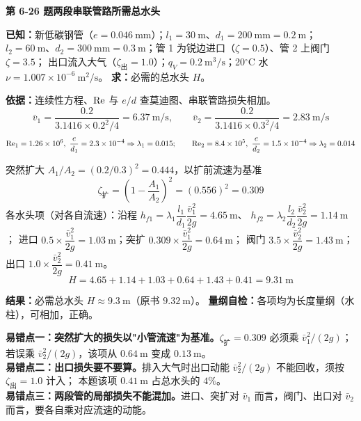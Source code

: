 \noindent\textbf{第 6-26 题\quad 两段串联管路所需总水头}

\begin{jie}
\textbf{已知：}新低碳钢管（$e=0.046\ \mathrm{mm}$）；$l_1=30\ \mathrm{m}$、$d_1=200\ \mathrm{mm}=0.2\ \mathrm{m}$；
$l_2=60\ \mathrm{m}$、$d_2=300\ \mathrm{mm}=0.3\ \mathrm{m}$；管 1 为锐边进口（$\zeta=0.5$）、管 2 上阀门 $\zeta=3.5$；
出口流入大气（$\zeta_{\text{出}}=1.0$）；$q_V=0.2\ \mathrm{m^3/s}$；20$^\circ$C 水 $\nu=1.007\times10^{-6}\ \mathrm{m^2/s}$。
\textbf{求：}必需的总水头 $H$。

\textbf{依据：}连续性方程、$\mathrm{Re}$ 与 $e/d$ 查莫迪图、串联管路损失相加。
\[ \bar v_1=\frac{0.2}{3.1416\times0.2^2/4}=6.37\ \mathrm{m/s},\qquad
\bar v_2=\frac{0.2}{3.1416\times0.3^2/4}=2.83\ \mathrm{m/s} \]
\[ \Rey_1=1.26\times10^6,\ \frac{e}{d_1}=2.3\times10^{-4}\Rightarrow\lambda_1=0.015;\qquad
\Rey_2=8.4\times10^5,\ \frac{e}{d_2}=1.5\times10^{-4}\Rightarrow\lambda_2=0.014 \]

突然扩大 $A_1/A_2=(0.2/0.3)^2=0.444$，以扩前流速为基准
\[ \zeta_{\text{扩}}=\left(1-\frac{A_1}{A_2}\right)^2=(0.556)^2=0.309 \]
各水头项（对各自流速）：沿程 $h_{f1}=\lambda_1\dfrac{l_1}{d_1}\dfrac{\bar v_1^2}{2g}=4.65\ \mathrm{m}$、
$h_{f2}=\lambda_2\dfrac{l_2}{d_2}\dfrac{\bar v_2^2}{2g}=1.14\ \mathrm{m}$；
进口 $0.5\times\dfrac{\bar v_1^2}{2g}=1.03\ \mathrm{m}$；突扩 $0.309\times\dfrac{\bar v_1^2}{2g}=0.64\ \mathrm{m}$；
阀门 $3.5\times\dfrac{\bar v_2^2}{2g}=1.43\ \mathrm{m}$；出口 $1.0\times\dfrac{\bar v_2^2}{2g}=0.41\ \mathrm{m}$。
\[ H=4.65+1.14+1.03+0.64+1.43+0.41=9.31\ \mathrm{m} \]

\textbf{结果：}必需总水头 $H\approx9.3\ \mathrm{m}$（原书 $9.32\ \mathrm{m}$）。
\textbf{量纲自检：}各项均为长度量纲（水柱），可相加，正确。
\end{jie}

\begin{yicuo}
\textbf{易错点一：突然扩大的损失以"小管流速"为基准。}$\zeta_{\text{扩}}=0.309$ 必须乘 $\bar v_1^2/(2g)$；
若误乘 $\bar v_2^2/(2g)$，该项从 $0.64\ \mathrm{m}$ 变成 $0.13\ \mathrm{m}$。\\
\textbf{易错点二：出口损失要不要算。}排入大气时出口动能 $\bar v_2^2/(2g)$ 不能回收，须按 $\zeta_{\text{出}}=1.0$ 计入；
本题该项 $0.41\ \mathrm{m}$ 占总水头的 $4\%$。\\
\textbf{易错点三：两段管的局部损失不能混加。}进口、突扩对 $\bar v_1$ 而言，阀门、出口对 $\bar v_2$ 而言，要各自乘对应流速的动能。
\end{yicuo}

